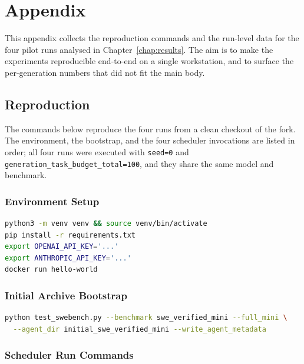 \chapter{Appendix}
\label{chap:appendix}

This appendix collects the reproduction commands and the run-level data
for the four pilot runs analysed in Chapter~\ref{chap:results}. The aim
is to make the experiments reproducible end-to-end on a single
workstation, and to surface the per-generation numbers that did not fit
the main body.

\section{Reproduction}
\label{app:reproduction}

The commands below reproduce the four runs from a clean checkout of
the fork. The environment, the bootstrap, and the four scheduler
invocations are listed in order; all four runs were executed with
\texttt{seed=0} and \texttt{generation\_task\_budget\_total=100}, and
they share the same model and benchmark.

\subsection{Environment Setup}

\begin{lstlisting}[language=bash,caption={Environment setup.},label={lst:env-setup}]
python3 -m venv venv && source venv/bin/activate
pip install -r requirements.txt
export OPENAI_API_KEY='...'
export ANTHROPIC_API_KEY='...'
docker run hello-world
\end{lstlisting}

\subsection{Initial Archive Bootstrap}

\begin{lstlisting}[language=bash,caption={Bootstrap the initial archive used by every pilot run.},label={lst:bootstrap}]
python test_swebench.py --benchmark swe_verified_mini --full_mini \
  --agent_dir initial_swe_verified_mini --write_agent_metadata
\end{lstlisting}

\subsection{Scheduler Run Commands}

